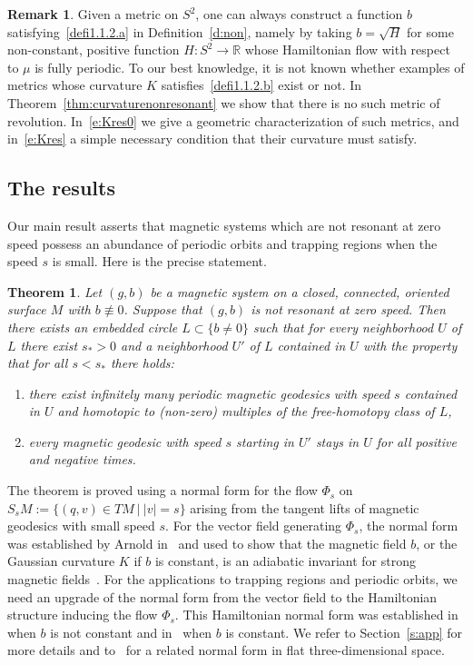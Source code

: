 \documentclass[10pt]{amsart}
\newtheorem{theo}[cdrthm]{Theorem}
\theoremstyle{definition}
\newtheorem{rema}[cdrthm]{Remark}
\newcommand{\R}{\mathbb{R}}
\begin{document}
\begin{rema}
Given a metric on $S^2$, one can always construct a function $b$ satisfying~\eqref{defi1.1.2.a} in Definition~\ref{d:non}, namely by taking $b=\sqrt{H}$ for some non-constant, positive function $H:S^2\to\R$ whose Hamiltonian flow with respect to $\mu$ is fully periodic. To our best knowledge, it is not known whether examples of metrics whose curvature $K$ satisfies~\eqref{defi1.1.2.b} exist or not. In Theorem~\ref{thm:curvaturenonresonant} we show that there is no such metric of revolution. In~\eqref{e:Kres0} we give a geometric characterization of such metrics, and in~\eqref{e:Kres} a simple necessary condition that their curvature must satisfy.
\end{rema}



\subsection{The results}\label{ss:main}
Our main result asserts that magnetic systems which are not resonant at zero speed possess an abundance of periodic orbits and trapping regions when the speed $s$ is small. Here is the precise statement.


\begin{theo}\label{t:main}
Let $(g,b)$ be a magnetic system on a closed, connected, oriented surface $M$ with $b\not\equiv0$. Suppose that $(g,b)$ is not resonant at zero speed. Then there exists an embedded circle $L\subset \{b\neq 0\}$ such that for every neighborhood $U$ of $L$ there exist $s_*>0$ and a neighborhood $U'$ of $L$ contained in $U$ with the property that for all $s<s_*$ there holds:
\begin{enumerate}
\item\label{theo1.4.1} there exist infinitely many periodic magnetic geodesics with speed $s$ contained in $U$ and homotopic to (non-zero) multiples of the free-homotopy class of $L$,
\item\label{theo1.4.2} every magnetic geodesic with speed $s$ starting in $U'$ stays in $U$ for all positive and negative times.
\end{enumerate}
\end{theo}


The theorem is proved using a normal form for the flow $\Phi_s$ on $S_sM:=\{(q,v)\in TM\ |\ |v|=s\}$ arising from the tangent lifts of magnetic geodesics with small speed $s$. For the vector field generating $\Phi_s$, the normal form was established by Arnold in~\cite{Arn97} and used to show that the magnetic field $b$, or the Gaussian curvature $K$ if $b$ is constant, is an adiabatic invariant for strong magnetic fields~\cite[Example~6.29]{AKN}. For the applications to trapping regions and periodic orbits, we need an upgrade of the normal form from the vector field to the Hamiltonian structure inducing the flow $\Phi_s$. This Hamiltonian normal form was established in~\cite{Castilho:2001} when $b$ is not constant and in~\cite{AB21} when $b$ is constant. We refer to Section~\ref{s:app} for more details and to~\cite{BS94} for a related normal form in flat three-dimensional space.
\end{document}
